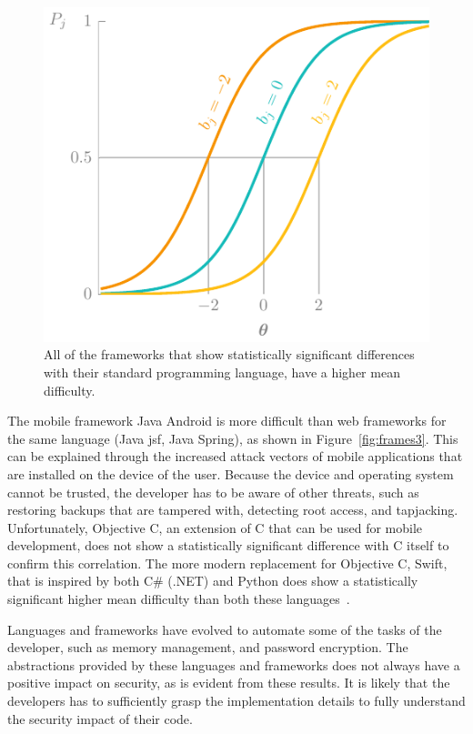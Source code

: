 \begin{figure}
    \centering
    \includegraphics[page=10]{03-education/figures/tikzfigures.pdf}
    \caption[Frameworks versus default languages]{All of the frameworks that show statistically significant differences with their standard programming language, have a higher mean difficulty.}
    \label{fig:frames2}
\end{figure}

The mobile framework Java Android is more difficult than web frameworks for the same language (Java \gls{jsf}, Java Spring), as shown in Figure~\ref{fig:frames3}.
This can be explained through the increased attack vectors of mobile applications that are installed on the device of the user.
Because the device and operating system cannot be trusted, the developer has to be aware of other threats, such as restoring backups that are tampered with, detecting root access, and tapjacking.
Unfortunately, Objective C, an extension of C that can be used for mobile development, does not show a statistically significant difference with C itself to confirm this correlation.
The more modern replacement for Objective C, Swift, that is inspired by both C\# (.NET) and Python does show a statistically significant higher mean difficulty than both these languages~\cite{nondot}.

Languages and frameworks have evolved to automate some of the tasks of the developer, such as memory management, and password encryption.
The abstractions provided by these languages and frameworks does not always have a positive impact on security, as is evident from these results.
It is likely that the developers has to sufficiently grasp the implementation details to fully understand the security impact of their code.

